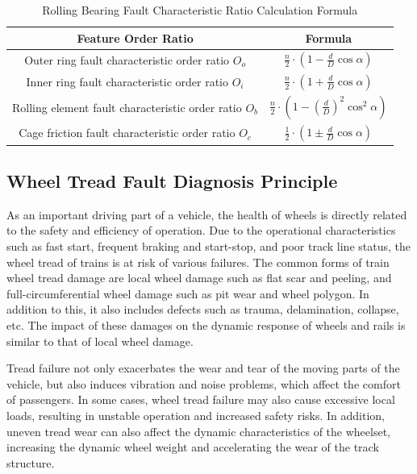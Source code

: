 \documentclass{article}
\begin{document}
\begin{table}
    \centering
    \caption{Rolling Bearing Fault Characteristic Ratio Calculation Formula}
    \label{tab:order-ratio}
    \begin{tabular}{|c|c|}
        \hline
        \toprule
        Feature Order Ratio & Formula \\
        \midrule
        Outer ring fault characteristic order ratio $O_o$ & $\frac{n}{2} \cdot \left( 1 - \frac{d}{D} \cos \alpha \right)$ \\ \hline
        Inner ring fault characteristic order ratio $O_i$ & $\frac{n}{2} \cdot \left( 1 + \frac{d}{D} \cos \alpha \right)$ \\   \hline
        Rolling element fault characteristic order ratio $O_b$ & $\frac{n}{2} \cdot \left( 1 - \left( \frac{d}{D} \right)^2 \cos^2 \alpha \right)$ \\   \hline
        Cage friction fault characteristic order ratio $O_{c}$ & $\frac{1}{2} \cdot \left( 1 \pm \frac{d}{D} \cos \alpha \right)$ \\ \hline
        \bottomrule
    \end{tabular}
\end{table}

\subsection{Wheel Tread Fault Diagnosis Principle}

As an important driving part of a vehicle, the health of wheels is directly related to the safety and efficiency of operation. Due to the operational characteristics such as fast start, frequent braking and start-stop, and poor track line status, the wheel tread of trains is at risk of various failures. The common forms of train wheel tread damage are local wheel damage such as flat scar and peeling, and full-circumferential wheel damage such as pit wear and wheel polygon. In addition to this, it also includes defects such as trauma, delamination, collapse, etc. The impact of these damages on the dynamic response of wheels and rails is similar to that of local wheel damage.

Tread failure not only exacerbates the wear and tear of the moving parts of the vehicle, but also induces vibration and noise problems, which affect the comfort of passengers. In some cases, wheel tread failure may also cause excessive local loads, resulting in unstable operation and increased safety risks. In addition, uneven tread wear can also affect the dynamic characteristics of the wheelset, increasing the dynamic wheel weight and accelerating the wear of the track structure.
\end{document}
